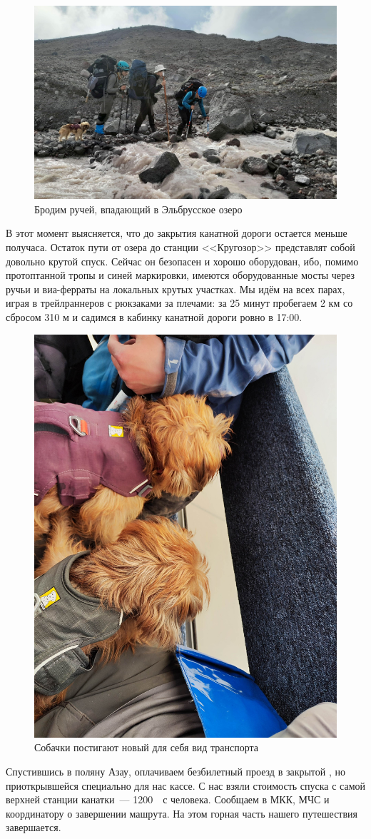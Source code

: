 \begin{figure}[h!]
	\centering
	\includegraphics[width=0.7\linewidth]{../pics/20240830_162252.jpg}
	\caption{Бродим ручей, впадающий в Эльбрусское озеро}
	\label{fig:20240830_162252.jpg}
\end{figure}

В этот момент выясняется, что до закрытия канатной дороги остается меньше получаса. Остаток пути от озера до станции <<Кругозор>> представлят собой довольно крутой спуск. Сейчас он безопасен и хорошо оборудован, ибо, помимо протоптанной тропы и синей маркировки, имеются оборудованные мосты через ручьи и виа-ферраты на локальных крутых участках. Мы идём на всех парах, играя в трейлраннеров с рюкзаками за плечами: за 25 минут пробегаем 2 км со сбросом 310 м и садимся в кабинку канатной дороги ровно в 17:00.

\begin{figure}[h!]
	\centering
	\includegraphics[width=0.4\linewidth]{../pics/IMG_20240830_170232.jpg}
	\caption{Собачки постигают новый для себя вид транспорта}
	\label{fig:IMG_20240830_170232.jpg}
\end{figure}

 Спустившись в поляну Азау, оплачиваем безбилетный проезд в закрытой , но приоткрывшейся специально для нас кассе. С нас взяли стоимость спуска с самой верхней станции канатки~--- 1200~\faRub~с человека. Сообщаем в МКК, МЧС и координатору о завершении машрута. На этом горная часть нашего путешествия завершается.

